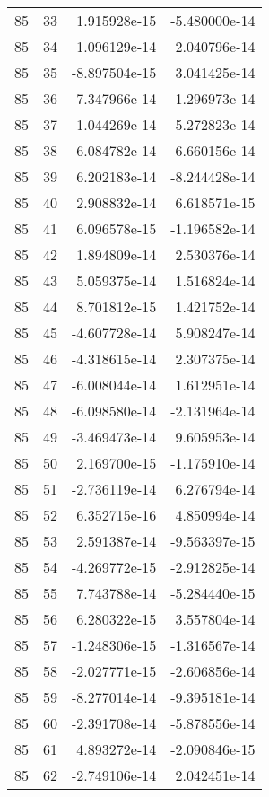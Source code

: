 \begin{tabular}{rrrr}
  85 &   33 &  1.915928e-15 & -5.480000e-14 \\
  85 &   34 &  1.096129e-14 &  2.040796e-14 \\
  85 &   35 & -8.897504e-15 &  3.041425e-14 \\
  85 &   36 & -7.347966e-14 &  1.296973e-14 \\
  85 &   37 & -1.044269e-14 &  5.272823e-14 \\
  85 &   38 &  6.084782e-14 & -6.660156e-14 \\
  85 &   39 &  6.202183e-14 & -8.244428e-14 \\
  85 &   40 &  2.908832e-14 &  6.618571e-15 \\
  85 &   41 &  6.096578e-15 & -1.196582e-14 \\
  85 &   42 &  1.894809e-14 &  2.530376e-14 \\
  85 &   43 &  5.059375e-14 &  1.516824e-14 \\
  85 &   44 &  8.701812e-15 &  1.421752e-14 \\
  85 &   45 & -4.607728e-14 &  5.908247e-14 \\
  85 &   46 & -4.318615e-14 &  2.307375e-14 \\
  85 &   47 & -6.008044e-14 &  1.612951e-14 \\
  85 &   48 & -6.098580e-14 & -2.131964e-14 \\
  85 &   49 & -3.469473e-14 &  9.605953e-14 \\
  85 &   50 &  2.169700e-15 & -1.175910e-14 \\
  85 &   51 & -2.736119e-14 &  6.276794e-14 \\
  85 &   52 &  6.352715e-16 &  4.850994e-14 \\
  85 &   53 &  2.591387e-14 & -9.563397e-15 \\
  85 &   54 & -4.269772e-15 & -2.912825e-14 \\
  85 &   55 &  7.743788e-14 & -5.284440e-15 \\
  85 &   56 &  6.280322e-15 &  3.557804e-14 \\
  85 &   57 & -1.248306e-15 & -1.316567e-14 \\
  85 &   58 & -2.027771e-15 & -2.606856e-14 \\
  85 &   59 & -8.277014e-14 & -9.395181e-14 \\
  85 &   60 & -2.391708e-14 & -5.878556e-14 \\
  85 &   61 &  4.893272e-14 & -2.090846e-15 \\
  85 &   62 & -2.749106e-14 &  2.042451e-14 \\

\end{tabular}
